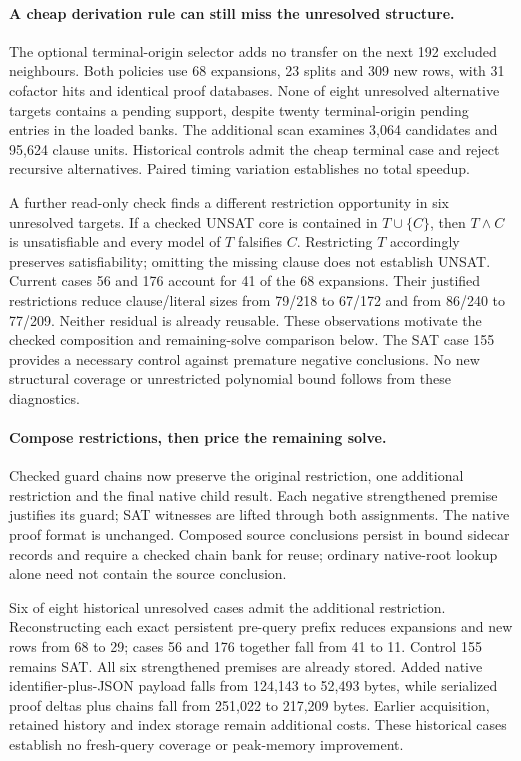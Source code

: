 \documentclass[11pt,a4paper]{article}
\numberwithin{equation}{section}
\theoremstyle{plain}
\theoremstyle{definition}
\theoremstyle{remark}
\begin{document}
\paragraph{A cheap derivation rule can still miss the unresolved structure.}
The optional terminal-origin selector adds no transfer on the next 192 excluded
neighbours. Both policies use 68 expansions, 23 splits and 309 new rows, with
31 cofactor hits and identical proof databases. None of eight unresolved
alternative targets contains a pending support, despite twenty terminal-origin
pending entries in the loaded banks. The additional scan examines 3,064
candidates and 95,624 clause units. Historical controls admit the cheap terminal
case and reject recursive alternatives. Paired timing variation establishes no
total speedup.

A further read-only check finds a different restriction opportunity in six
unresolved targets. If a checked UNSAT core is contained in $T\cup\{C\}$, then
$T\wedge C$ is unsatisfiable and every model of $T$ falsifies $C$. Restricting
$T$ accordingly preserves satisfiability; omitting the missing clause does not
establish UNSAT. Current cases 56 and 176 account for 41 of the 68 expansions.
Their justified restrictions reduce clause/literal sizes from 79/218 to 67/172
and from 86/240 to 77/209. Neither residual is already reusable. These observations motivate the checked
composition and remaining-solve comparison below. The SAT case 155 provides a necessary control against
premature negative conclusions. No new structural coverage or unrestricted
polynomial bound follows from these diagnostics.

\paragraph{Compose restrictions, then price the remaining solve.}
Checked guard chains now preserve the original restriction, one additional
restriction and the final native child result. Each negative strengthened
premise justifies its guard; SAT witnesses are lifted through both assignments.
The native proof format is unchanged. Composed source conclusions persist in
bound sidecar records and require a checked chain bank for reuse; ordinary
native-root lookup alone need not contain the source conclusion.

Six of eight historical unresolved cases admit the additional restriction.
Reconstructing each exact persistent pre-query prefix reduces expansions and new
rows from 68 to 29; cases 56 and 176 together fall from 41 to 11. Control 155
remains SAT. All six strengthened premises are already stored. Added native
identifier-plus-JSON payload falls from 124,143 to 52,493 bytes, while serialized
proof deltas plus chains fall from 251,022 to 217,209 bytes. Earlier acquisition,
retained history and index storage remain additional costs. These historical
cases establish no fresh-query coverage or peak-memory improvement.
\end{document}

